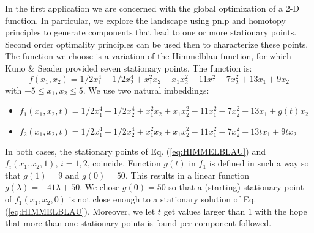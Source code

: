 In the first application we are concerned with the global optimization of a 2-D
function. In particular, we explore the landscape using \acrshort{pnlp} and 
homotopy
principles to generate components that lead to one or more stationary points.
Second order optimality principles can be used then to characterize these
points. The function we choose is a variation of the Himmelblau function, for
which Kuno \& Seader\cite{Kuno:1988} provided seven stationary points. The
function is:
\begin{equation}
	f(x_1,x_2) =
	1^{}/2x_1^4+1^{}/2x_2^4+x_1^2x_2+x_1x_2^2-11x_1^2-7x_2^2+13x_1+9x_2
	\label{eq:HIMMELBLAU}
\end{equation}
with $-5\leq x_1,x_2\leq 5$. We use two natural imbeddings:
\begin{itemize}
	\item $f_1(x_1,x_2,t) =
	1^{}/2x_1^4+1^{}/2x_2^4+x_1^2x_2+x_1x_2^2-11x_1^2-7x_2^2+13x_1+g(t)x_2$
	\item $f_2(x_1,x_2,t) =
	1^{}/2x_1^4+1^{}/2x_2^4+x_1^2x_2+x_1x_2^2-11x_1^2-7x_2^2+13t x_1+9t x_2$
\end{itemize}
In both cases, the stationary points of Eq. (\ref{eq:HIMMELBLAU}) and 
$f_i(x_1,x_2,1)$, $i=1,2$, coincide. Function $g(t)$ in $f_1$ is defined in
such a way so that $g(1)=9$ and $g(0)=50$. This results in a linear function
$g(\lambda)=-41\lambda+50$. We chose $g(0)=50$ so that a (starting) stationary
point of $f_1(x_1,x_2,0)$ is not close enough to a stationary solution of Eq.
(\ref{eq:HIMMELBLAU}). Moreover, we let
$t$ get values larger than $1$ with the hope that more than one stationary
points is found per component followed. 

